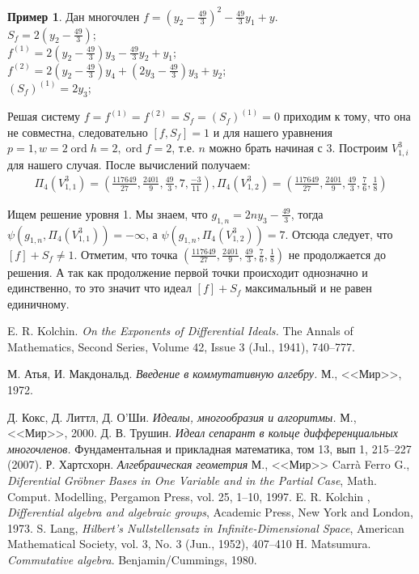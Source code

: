 \documentclass[16pt]{article}
\DeclareMathOperator{\ord}{ord}
\theoremstyle{plain1}
\theoremstyle{plain2}
\theoremstyle{plain}
\theoremstyle{plain3}
\theoremstyle{definition}
\newtheorem{example}[theorem3]{Пример}
\theoremstyle{remark}
\begin{document}
\begin{example}
Дан многочлен $f=(y_2-\frac{49}{3})^2-\frac{49}{3}y_1+y$.
\\
$S_f=2(y_2-\frac{49}{3})$;
\\
$f^{(1)}=2(y_2-\frac{49}{3})y_3-\frac{49}{3}y_2+y_1$;
\\
$f^{(2)}=2(y_2-\frac{49}{3})y_4+(2y_3-\frac{49}{3})y_3+y_2$;
\\
$(S_f)^{(1)}=2y_3$;

Решая систему $f=f^{(1)}=f^{(2)}=S_f=(S_f)^{(1)}=0$ приходим к тому,
что она не совместна, следовательно $[f,S_f]=1$ и  для нашего
уравнения $p=1,w=2\ord{h}=2,\ord{f}=2$, т.е. $n$  можно брать начиная с $3$. Построим ${V}_{1,i}^3$ для нашего случая. После вычислений получаем: 
\begin{gather*}
\Pi_{4}({V}_{1,1}^3)=\left(\frac{117649}{27},\frac{2401}{9},\frac{49}{3},7,\frac{-3}{11}\right),
\Pi_{4}({V}_{1,2}^3)=\left(\frac{117649}{27},\frac{2401}{9},\frac{49}{3},\frac{7}{6},\frac{1}{8}\right)
\end{gather*}

Ищем решение уровня 1. Мы знаем, что $g_{1,n}=2ny_3-\frac{49}{3}$, тогда $\psi(g_{1,n},\Pi_{4}({V}_{1,1}^3))=-\infty$, а $\psi(g_{1,n},\Pi_{4}({V}_{1,2}^3))=7$. Отсюда следует, что $[f]+S_f\not=1$. Отметим, что точка $\left(\frac{117649}{27},\frac{2401}{9},\frac{49}{3},\frac{7}{6},\frac{1}{8}\right)$ не продолжается до решения.  А так как продолжение первой точки происходит однозначно и единственно, то это значит что идеал $[f]+S_f$ максимальный и не равен единичному.


\end{example}







\begin{thebibliography}{99}

E. R. Kolchin.
\emph{On the Exponents of Differential Ideals.}
The Annals of Mathematics, Second Series, Volume 42, Issue 3 (Jul., 1941), 740--777.

М. Атья, И. Макдональд.
\emph{Введение в коммутативную алгебру.} М., <<Мир>>, 1972.

Д. Кокс, Д. Литтл, Д. О'Ши.
\emph{Идеалы, многообразия и алгоритмы.}
М., <<Мир>>, 2000.
Д. В. Трушин.
\emph{Идеал сепарант в кольце дифференциальных многочленов.}
Фундаментальная и прикладная математика, том 13, вып 1, 215--227 (2007).
Р. Хартсхорн.
\emph{Алгебраическая геометрия}
М., <<Мир>>
Carr\`a Ferro G.,
\emph{Diferential Gr\"{o}bner Bases in One Variable and in the Partial Case},
Math. Comput. Modelling, Pergamon Press, vol. 25, 1--10, 1997.
E. R. Kolchin ,
\emph{Differential algebra and algebraic groups}, Academic Press, New York and London, 1973.
S. Lang,
\emph{Hilbert's Nullstellensatz in Infinite-Dimensional Space}, American Mathematical Society, vol. 3, No. 3 (Jun., 1952), 407--410
H. Matsumura.
\emph{Commutative algebra}.
Benjamin/Cummings, 1980.
\end{thebibliography}
\end{document}

